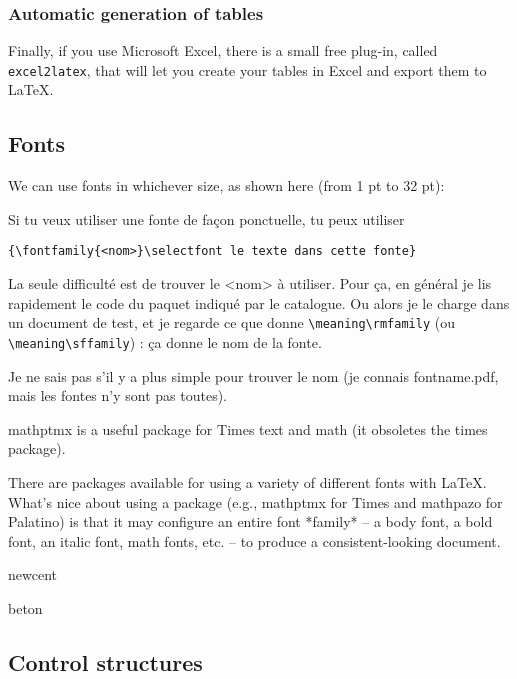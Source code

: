 \documentclass{mcreport}
\begin{document}
\subsubsection{Automatic generation of tables}
\label{sec:autom-gener-tabl}

Finally, if you use Microsoft Excel, there is a small free plug-in, called
\texttt{excel2latex}, that will let you create your tables in Excel and
export them to \LaTeX{}.

\subsection{Fonts}
\label{sec:fonts}

We can use fonts in whichever size, as shown here (from 1 pt to 32 pt):



Si tu veux utiliser une fonte de façon ponctuelle, tu peux utiliser

\begin{verbatim}
{\fontfamily{<nom>}\selectfont le texte dans cette fonte}
\end{verbatim}

La seule difficulté est de trouver le <nom> à utiliser. Pour ça, en général
je lis rapidement le code du paquet indiqué par le catalogue. Ou alors je le
charge dans un document de test, et je regarde ce que donne
\verb|\meaning\rmfamily| (ou \verb|\meaning\sffamily|) : ça donne le nom de
la fonte.

Je ne sais pas s'il y a plus simple pour trouver le nom (je connais
fontname.pdf, mais les fontes n'y sont pas toutes).

mathptmx is a useful package for Times text and math (it obsoletes the times
package).

There are packages available for using a variety of different fonts with
LaTeX. What's nice about using a package (e.g., mathptmx for Times and
mathpazo for Palatino) is that it may configure an entire font *family* -- a
body font, a bold font, an italic font, math fonts, etc. -- to produce a
consistent-looking document.

newcent

beton

\subsection{Control structures}
\label{sec:control-structures}
\end{document}
